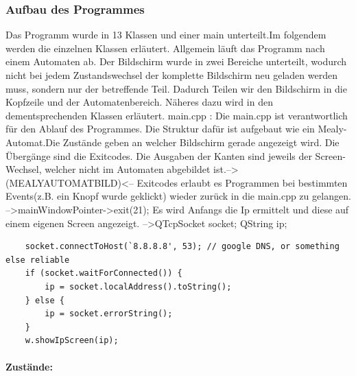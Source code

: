\documentclass[11pt,a4paper]{article} %
\begin{document}
\subsubsection{Aufbau des Programmes}
Das Programm wurde in 13 Klassen und einer main unterteilt.Im folgendem werden die einzelnen Klassen erläutert.
Allgemein läuft das Programm nach einem Automaten ab. Der Bildschirm wurde in zwei Bereiche unterteilt, wodurch nicht bei jedem Zustandswechsel der komplette Bildschirm neu geladen werden muss, sondern nur der betreffende Teil.
Dadurch Teilen wir den Bildschirm in die Kopfzeile und der Automatenbereich. Näheres dazu wird in den dementsprechenden Klassen erläutert.
main.cpp :
	Die main.cpp ist verantwortlich für den Ablauf des Programmes. Die Struktur dafür ist aufgebaut wie ein Mealy-Automat.Die Zustände geben an welcher Bildschirm gerade angezeigt wird. Die Übergänge sind die Exitcodes.
	Die Ausgaben der Kanten sind jeweils der Screen-Wechsel, welcher nicht im Automaten abgebildet ist.-->(MEALYAUTOMATBILD)<--
	Exitcodes erlaubt es Programmen bei bestimmten Events(z.B. ein Knopf wurde geklickt) wieder zurück in die main.cpp zu gelangen.
	 -->mainWindowPointer->exit(21); 
	Es wird Anfangs die Ip ermittelt und diese auf einem eigenen Screen angezeigt.
	-->QTcpSocket socket;
    QString ip;
\begin{frame}

\begin{lstlisting}
    socket.connectToHost(`8.8.8.8', 53); // google DNS, or something else reliable
    if (socket.waitForConnected()) {
        ip = socket.localAddress().toString();
    } else {
        ip = socket.errorString();
    }
    w.showIpScreen(ip);
\end{lstlisting}
\end{frame}
\par
\paragraph{Zustände:} $\;$ \\
	
\end{document}
